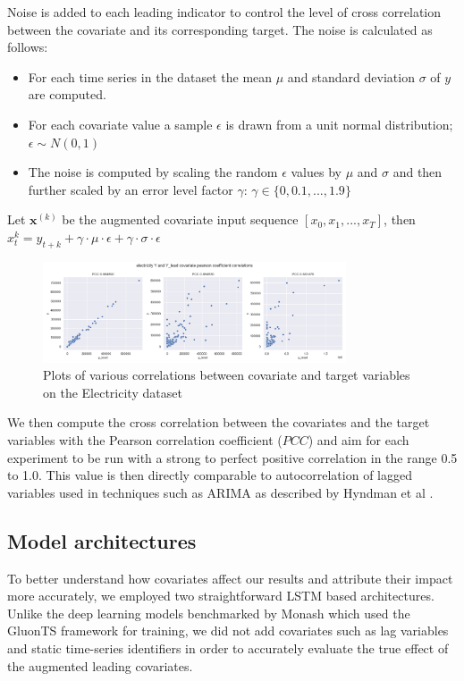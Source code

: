 \documentclass{article}
\newcommand{\pearson}{PCC}
\begin{document}
Noise is added to each leading indicator to control the level of cross correlation between the covariate and its 
corresponding target. The noise is calculated as follows: 

\begin{itemize}
\item For each time series in the dataset the mean $\mu$ and standard deviation $\sigma$ of $y$ are computed.
\item For each covariate value a sample $\epsilon$ is drawn from a unit normal distribution; $\epsilon \sim N(0,1)$ 
\item The noise is computed by scaling the random $\epsilon$ values by $\mu$ and $\sigma$ and then further
scaled by an error level factor $\gamma$:
$\gamma \in \{0, 0.1, ..., 1.9\}$
\end{itemize}
Let $\mathbf{x}^{(k)}$ be the augmented covariate input sequence $[x_0, x_1, ..., x_T]$, 
then $x^{k}_t = y_{t+k} + \gamma \cdot \mu \cdot \epsilon + \gamma \cdot \sigma \cdot \epsilon $
\begin{figure}[ht]
\centering
\includegraphics[width=0.8\textwidth]{figures/electricity-pcc.png}
\caption{Plots of various correlations between covariate and target variables on the Electricity dataset}
\label{fig:my_label}
\end{figure}
We then compute the cross correlation between the covariates and the target variables with the Pearson correlation coefficient ($\pearson$) 
and aim for each experiment to be run with a strong to perfect positive correlation in the range 0.5 to 1.0. This value is then directly 
comparable to autocorrelation of lagged variables used in techniques such as ARIMA as described by Hyndman et al \cite{hyndman2021forecasting}.

\subsection{Model architectures}
To better understand how covariates affect our results and attribute their impact more accurately, 
we employed two straightforward LSTM based architectures. Unlike the deep learning models benchmarked 
by Monash \cite{DBLP:conf/nips/GodahewaBWHM21} which used the GluonTS \cite{gluonts_arxiv} framework 
for training, we did not add covariates such as lag variables and static time-series identifiers in order to 
accurately evaluate the true effect of the augmented leading covariates. 
\end{document}
